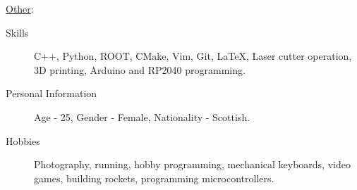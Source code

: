 \documentclass[10pt]{article}
\begin{document}
\begin{bgbox}[height=\paperheight,colback=gray,width=0.7\textwidth]
\begin{description}
\begin{description}
        \end{description}
    \end{description}
    \begin{description}
        \item \underline{Other}:
        \begin{description}
            \item[Skills] C++, Python, ROOT, CMake, Vim, Git, LaTeX, Laser cutter operation, 3D printing, Arduino and RP2040 programming.
            \item[Personal Information] Age - 25, Gender - Female, Nationality - Scottish.
            \item[Hobbies] Photography, running, hobby programming, mechanical keyboards, video games, building rockets, programming microcontrollers.
        \end{description}
    \end{description}

\end{bgbox}
\end{document}
